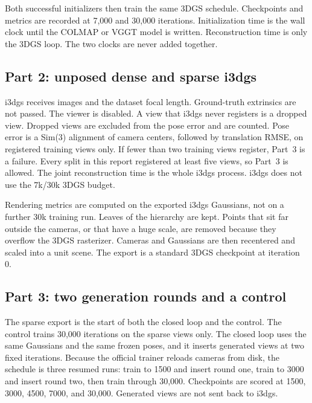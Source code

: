 \documentclass[10pt,twocolumn,letterpaper]{article}
\begin{document}
Both successful initializers then train the same 3DGS schedule.
Checkpoints and metrics are recorded at 7{,}000 and 30{,}000 iterations.
Initialization time is the wall clock until the COLMAP or VGGT model is written.
Reconstruction time is only the 3DGS loop.
The two clocks are never added together.

\subsection{Part 2: unposed dense and sparse i3dgs}
i3dgs receives images and the dataset focal length.
Ground-truth extrinsics are not passed.
The viewer is disabled.
A view that i3dgs never registers is a dropped view.
Dropped views are excluded from the pose error and are counted.
Pose error is a Sim(3) alignment of camera centers, followed by translation RMSE, on registered training views only.
If fewer than two training views register, Part~3 is a failure.
Every split in this report registered at least five views, so Part~3 is allowed.
The joint reconstruction time is the whole i3dgs process.
i3dgs does not use the 7k/30k 3DGS budget.

Rendering metrics are computed on the exported i3dgs Gaussians, not on a further 30k training run.
Leaves of the hierarchy are kept.
Points that sit far outside the cameras, or that have a huge scale, are removed because they overflow the 3DGS rasterizer.
Cameras and Gaussians are then recentered and scaled into a unit scene.
The export is a standard 3DGS checkpoint at iteration 0.

\subsection{Part 3: two generation rounds and a control}
The sparse export is the start of both the closed loop and the control.
The control trains 30{,}000 iterations on the sparse views only.
The closed loop uses the same Gaussians and the same frozen poses, and it inserts generated views at two fixed iterations.
Because the official trainer reloads cameras from disk, the schedule is three resumed runs: train to 1500 and insert round one, train to 3000 and insert round two, then train through 30{,}000.
Checkpoints are scored at 1500, 3000, 4500, 7000, and 30{,}000.
Generated views are not sent back to i3dgs.
\end{document}

